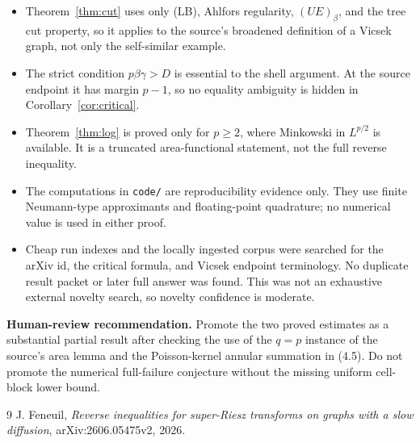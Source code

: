 \documentclass[11pt]{article}
\theoremstyle{remark}
\begin{document}
\begin{itemize}
\item Theorem~\ref{thm:cut} uses only (LB), Ahlfors regularity, $(UE)_\beta$,
and the tree cut property, so it applies to the source's broadened definition
of a Vicsek graph, not only the self-similar example.
\item The strict condition $p\beta\gamma>D$ is essential to the shell argument.
At the source endpoint it has margin $p-1$, so no equality ambiguity is hidden
in Corollary~\ref{cor:critical}.
\item Theorem~\ref{thm:log} is proved only for $p\geq2$, where Minkowski in
$L^{p/2}$ is available.  It is a truncated area-functional statement, not the
full reverse inequality.
\item The computations in \texttt{code/} are reproducibility evidence only.
They use finite Neumann-type approximants and floating-point quadrature; no
numerical value is used in either proof.
\item Cheap run indexes and the locally ingested corpus were searched for the
arXiv id, the critical formula, and Vicsek endpoint terminology.  No duplicate
result packet or later full answer was found.  This was not an exhaustive
external novelty search, so novelty confidence is moderate.
\end{itemize}

\noindent\textbf{Human-review recommendation.}
Promote the two proved estimates as a substantial partial result after checking
the use of the $q=p$ instance of the source's area lemma and the Poisson-kernel
annular summation in (4.5).  Do not promote the numerical full-failure
conjecture without the missing uniform cell-block lower bound.

\begin{thebibliography}{9}
J. Feneuil,
\emph{Reverse inequalities for super-Riesz transforms on graphs with a slow
diffusion}, arXiv:2606.05475v2, 2026.
\end{thebibliography}
\end{document}
